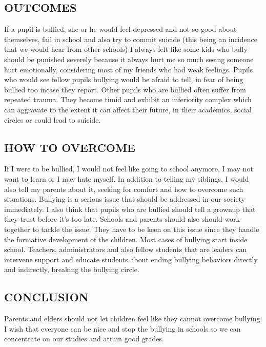 \documentclass{article}
\begin{document}
\subsection{ OUTCOMES}{ If a pupil is bullied, she or he would feel depressed and not so good about themselves, fail in school and also try to commit suicide (this being an incidence that we would hear from other schools) I always felt like some kids who bully should be punished severely because it always hurt me so much seeing someone hurt emotionally, considering most of my friends who had weak feelings. Pupils who would see fellow pupils bullying would be afraid to tell, in fear of being bullied too incase they report. 
Other pupils who are bullied often suffer from repeated trauma. They become timid and exhibit an inferiority complex which can aggravate to the extent it can affect their future, in their academics, social circles or could lead to suicide.
}
\subsection{HOW TO OVERCOME}{If I were to be bullied, I would not feel like going to school anymore, I may not want to learn or I may hate myself. In addition to telling my siblings, I would also tell my parents about it, seeking for comfort and how to overcome such situations.
Bullying is a serious issue that should be addressed in our society immediately. I also think that pupils who are bullied should tell a grownup that they trust before it’s too late. Schools and parents should also should work together to tackle the issue. They have to be keen on this issue since they handle the formative development of the children. Most cases of bullying start inside school. Teachers, administrators and also fellow students that are leaders can intervene support and educate students about ending bullying behaviors directly and indirectly, breaking the bullying circle. 
}
\subsection{CONCLUSION }{Parents and elders should not let children feel like they cannot overcome bullying. I wish that everyone can be nice and stop the bullying in schools so we can concentrate on our studies and attain good grades.                                       }
\end{document}
